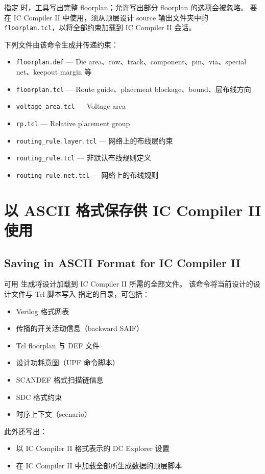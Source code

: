 指定  时，工具写出完整 floorplan；允许写出部分 floorplan 的选项会被忽略。
要在 IC Compiler II 中使用，须从顶层设计 source 输出文件夹中的 \texttt{floorplan.tcl}，以将全部约束加载到 IC Compiler II 会话。

下列文件由该命令生成并传递约束：
\begin{itemize}
  \item \texttt{floorplan.def} — Die area、row、track、component、pin、via、special net、keepout margin 等
  \item \texttt{floorplan.tcl} — Route guide、placement blockage、bound、层布线方向
  \item \texttt{voltage\_area.tcl} — Voltage area
  \item \texttt{rp.tcl} — Relative placement group
  \item \texttt{routing\_rule.layer.tcl} — 网络上的布线层约束
  \item \texttt{routing\_rule.tcl} — 非默认布线规则定义
  \item \texttt{routing\_rule.net.tcl} — 网络上的布线规则
\end{itemize}

\section{以 ASCII 格式保存供 IC Compiler II 使用}
\subsection*{Saving in ASCII Format for IC Compiler II}

可用  生成将设计加载到 IC Compiler II 所需的全部文件。
该命令将当前设计的设计文件与 Tcl 脚本写入  指定的目录，可包括：
\begin{itemize}
  \item Verilog 格式网表
  \item 传播的开关活动信息（backward SAIF）
  \item Tcl floorplan 与 DEF 文件
  \item 设计功耗意图（UPF 命令脚本）
  \item SCANDEF 格式扫描链信息
  \item SDC 格式约束
  \item 时序上下文（scenario）
\end{itemize}

此外还写出：
\begin{itemize}
  \item 以 IC Compiler II 格式表示的 DC Explorer 设置
  \item 在 IC Compiler II 中加载全部所生成数据的顶层脚本
\end{itemize}

